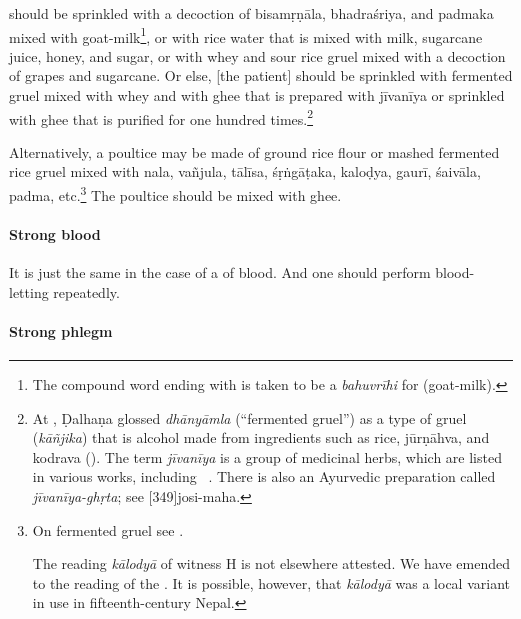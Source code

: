 \begin{translation}
 should be sprinkled with a decoction of
\gls{bisamṛṇāla}, \gls{bhadraśriya}, and \gls{padmaka} mixed with
goat-milk\footnote{The compound word ending with  is
    taken to be a \textit{bahuvrīhi} for  (goat-milk).},
    or with rice water that is mixed with milk, sugarcane juice, honey,
    and sugar, or with whey and sour rice gruel mixed with a decoction of
    grapes and sugarcane. Or else, [the patient] should be sprinkled with
    fermented gruel mixed with whey and with ghee that is prepared with
    \gls{jīvanīya} or sprinkled with ghee that is purified for one
    hundred times.\footnote{At , Ḍalhaṇa glossed
        \emph{dhānyāmla} (``fermented gruel'') as a type of gruel
        (\emph{kāñjika}) that is alcohol made from ingredients such as rice,
        \gls{jūrṇāhva}, and \gls{kodrava} (). The term \emph{jīvanīya} is a
        group of medicinal herbs, which are listed in various works, including
        \CS\ . There is also an Ayurvedic preparation called
        \emph{jīvanīya-ghṛta}; see [349]{josi-maha}.\label{jīvanīya}} %

Alternatively, a poultice may
be made of ground rice flour or mashed fermented rice gruel mixed with
\gls{nala}, \gls{vañjula},
\gls{tālīsa},
\gls{śṛṅgāṭaka}, 
\gls{kaloḍya},
\gls{gaurī}, \gls{śaivāla},
\gls{padma}, etc.\footnote{On fermented  gruel see \cite[23, et passim]{mchu-2021}.

The reading \emph{kālodyā} of witness H is not elsewhere attested. We
have emended to the reading of the \citep[425]{vulgate}. It is
possible, however, that \emph{kālodyā} was a local variant in use in
fifteenth-century Nepal.} The poultice should be mixed with ghee.


\paragraph{Strong blood}    

\item[9]

It is just the same in the case of a  of blood. And
one should perform blood-letting repeatedly.


\paragraph{Strong phlegm}  


\end{translation}
